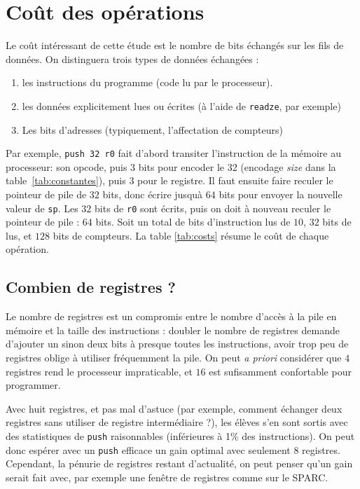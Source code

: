 \documentclass[architecture]{compas2018}
\begin{document}
\section{Coût des opérations}
Le coût intéressant de cette étude est le nombre de bits échangés sur les fils de données. On distinguera trois types de données échangées : 
\begin{enumerate}
\item les instructions du programme (code lu par le processeur).
\item les données explicitement lues ou écrites (à l'aide de \texttt{readze}, par exemple)
\item Les bits d'adresses (typiquement, l'affectation de compteurs)
\end{enumerate}

Par exemple, \texttt{push 32 r0} fait d'abord transiter l'instruction de la mémoire au processeur: son opcode, puis  $3$ bits  pour encoder le 32 (encodage \emph{size} dans la table~\ref{tab:constantes}), puis $3$ pour le registre.
Il faut ensuite faire reculer le pointeur de pile de $32$ bits, donc écrire jusquà $64$ bits pour envoyer la nouvelle valeur de \texttt{sp}.
Les $32$ bits de \texttt{r0} sont écrits, puis on doit à nouveau  reculer le pointeur de pile : $64$ bits. Soit un total de bits d'instruction lus de $10$, $32$ bits de lus, et $128$ bits de compteurs.
La table \ref{tab:costs} résume le coût de chaque opération.

\subsection{Combien de registres ?}
Le nombre de registres est un compromis entre le nombre d'accès à la pile en mémoire et la taille des instructions : doubler le nombre de registres demande d'ajouter un sinon deux bits à presque toutes les instructions, avoir trop peu de registres oblige à utiliser fréquemment la pile. On peut {\it a priori} considérer que $4$ registres rend le processeur impraticable, et $16$ est sufisamment confortable pour programmer.\par
Avec huit registres, et pas mal d'astuce (par exemple, comment échanger deux registres sans utiliser de registre intermédiaire ?), les élèves s'en sont sortis avec des statistiques de \texttt{push} raisonnables (inférieures à 1\% des instructions). On peut donc espérer avec un \texttt{push} efficace un gain optimal avec seulement 8 registres. Cependant, la pénurie de registres restant d'actualité, on peut penser qu'un gain serait fait avec, par exemple une fenêtre de registres comme sur le SPARC.
\end{document}
